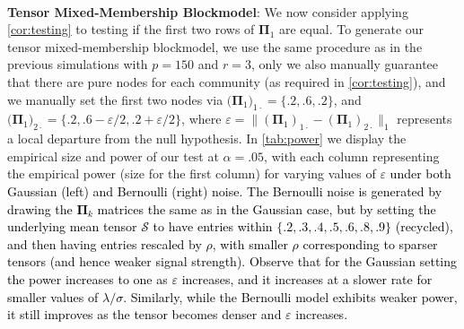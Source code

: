 \documentclass[10pt]{article}
\newcommand{\0}{{\mathbf{0}}}
\newcommand{\1}{{\mathbf{1}}}
\newcommand{\eps}{\varepsilon}
\begin{document}

\ \\
\textbf{Tensor Mixed-Membership  Blockmodel}: We now consider applying \cref{cor:testing} to testing if the first two rows of $\mathbf{\Pi}_1$ are equal.  To generate our tensor mixed-membership blockmodel, we use the same procedure as in the previous simulations with  $p = 150$ and $r = 3$, only we also manually guarantee that there are pure nodes for each community (as required in \cref{cor:testing}), and we manually set the first two nodes via $\big(\mathbf{\Pi}_1\big)_{1\cdot} = \{.2,.6,.2\}$, and $\big(\mathbf{\Pi}_1\big)_{2\cdot} = \{.2,.6-\eps/2,.2+\eps/2\}$, where $\eps = \|(\mathbf{\Pi}_1)_{1\cdot} - (\mathbf{\Pi}_1)_{2\cdot} \|_1$ represents a local departure from the null hypothesis.  In \cref{tab:power} we display the empirical size and power of our test at $\alpha = .05$, with each column representing the empirical power (size for the first column) for varying values of $\eps$ \textcolor{black}{under both Gaussian (left) and Bernoulli (right) noise. The Bernoulli noise is generated by drawing the $\mathbf{\Pi}_k$ matrices the same as in the Gaussian case, but by setting the underlying mean tensor $\mathcal{S}$ to have entries within $\{.2,.3,.4,.5,.6,.8,.9\}$ (recycled), and then having entries rescaled by $\rho$, with smaller $\rho$ corresponding to sparser tensors (and hence weaker signal strength). Observe that for the Gaussian setting the power increases to one as $\eps$ increases, and it increases at a slower rate for smaller values of $\lambda/\sigma$.  Similarly, while the Bernoulli model exhibits weaker power, it still improves as the tensor becomes denser and $\eps$ increases.}
\end{document}
